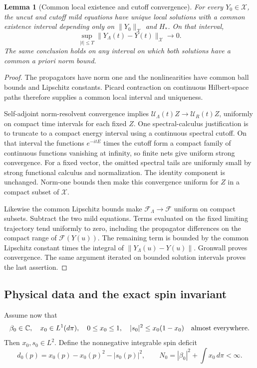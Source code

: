 \documentclass[11pt]{article}
\newtheorem{lemma}[theorem]{Lemma}
\theoremstyle{remark}
\begin{document}
\begin{lemma}[Common local existence and cutoff convergence]
\label{lem:v20v66-local}
For every \(Y_0\in\mathcal X\), the uncut and cutoff
mild equations have unique local solutions with a
common existence interval depending only on
\(\|Y_0\|_{\mathcal X}\) and \(H_*\).
On that interval,
\[
 \sup_{|t|\leq T}\|Y_\Lambda(t)-Y(t)\|_{\mathcal X}
                                 \longrightarrow0 .
\]
The same conclusion holds on any interval on which
both solutions have a common a priori norm bound.
\end{lemma}
\begin{proof}
The propagators have norm one and the nonlinearities
have common ball bounds and Lipschitz constants.
Picard contraction on continuous Hilbert-space paths
therefore supplies a common local interval and uniqueness.

Self-adjoint norm-resolvent convergence implies
\(\mathcal U_\Lambda(t)Z\to\mathcal U_R(t)Z\),
uniformly on compact time intervals for each fixed \(Z\).
One spectral-calculus justification is to truncate to
a compact energy interval using a continuous spectral
cutoff.  On that interval the functions
\(e^{-itE}\) times the cutoff form a compact family
of continuous functions vanishing at infinity, so
finite nets give uniform strong convergence.
For a fixed vector, the omitted spectral tails are
uniformly small by strong functional calculus and
normalization.  The identity component is unchanged.
Norm-one bounds then make this convergence uniform
for \(Z\) in a compact subset of \(\mathcal X\).

Likewise the common Lipschitz bounds make
\(\mathcal F_\Lambda\to\mathcal F\) uniform on compact
subsets.  Subtract the two mild equations.  Terms
evaluated on the fixed limiting trajectory tend
uniformly to zero, including the propagator differences
on the compact range of \(\mathcal F(Y(u))\).
The remaining term is bounded by the common Lipschitz
constant times the integral of
\(\|Y_\Lambda(u)-Y(u)\|\).
Gronwall proves convergence.  The same argument
iterated on bounded solution intervals proves
the last assertion.
\end{proof}

\subsection{Physical data and the exact spin invariant}

Assume now that
\[
 \beta_0\in\mathbb C,\quad x_0\in L^1(d\pi),\quad
 0\leq x_0\leq1,\quad
 |s_0|^2\leq x_0(1-x_0)\quad\hbox{almost everywhere}.
\]
Then \(x_0,s_0\in L^2\).  Define the nonnegative
integrable spin deficit
\[
 d_0(p)=x_0(p)-x_0(p)^2-|s_0(p)|^2,
 \qquad
 N_0=|\beta_0|^2+\int x_0\,d\pi<\infty .
\]
\end{document}
